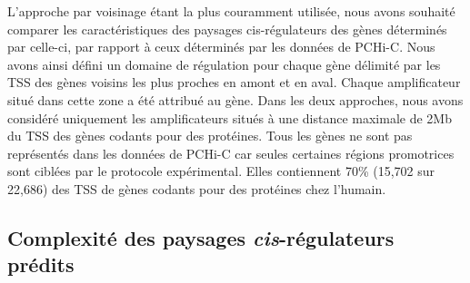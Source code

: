L’approche par voisinage étant la plus couramment utilisée, nous avons souhaité comparer les caractéristiques des paysages \gls{cis}-régulateurs des gènes déterminés par celle-ci, par rapport à ceux déterminés par les données de \gls{PCHi-C}. Nous avons ainsi défini un domaine de régulation pour chaque gène délimité par les \acrshort{TSS} des gènes voisins les plus proches en amont et en aval. Chaque \gls{amplificateur} situé dans cette zone a été attribué au gène. Dans les deux approches, nous avons considéré uniquement les \glspl{amplificateur} situés à une distance maximale de 2Mb du \acrshort{TSS} des gènes codants pour des protéines. Tous les gènes ne sont pas représentés dans les données de \gls{PCHi-C} car seules certaines régions promotrices sont ciblées par le protocole expérimental. Elles contiennent 70\% (15,702 sur 22,686) des \acrshort{TSS} de gènes codants pour des protéines chez l’humain. 

\subsection{Complexité des paysages \textit{cis}-régulateurs prédits}
\label{subsec:complexité-predit}

